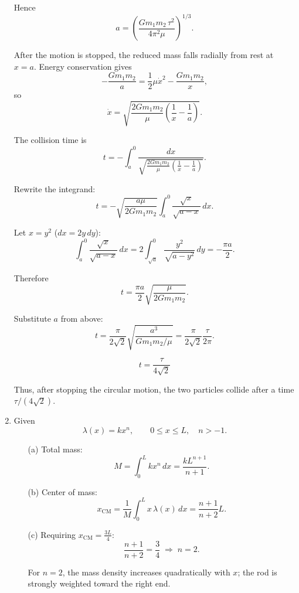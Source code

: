 \documentclass[12pt]{article}
\begin{document}
\begin{enumerate}
Hence
\[
a=\left(\frac{G m_1 m_2\,\tau^2}{4\pi^2\mu}\right)^{1/3}.
\]

After the motion is stopped, the reduced mass falls radially from rest at \(x=a\).
Energy conservation gives
\[
-\frac{G m_1 m_2}{a}
=\frac12\mu \dot x^2-\frac{G m_1 m_2}{x},
\]
so
\[
\dot x=\sqrt{\frac{2G m_1 m_2}{\mu}\left(\frac1x-\frac1a\right)}.
\]

The collision time is
\[
t=-\int_a^0
\frac{dx}{\sqrt{\tfrac{2G m_1 m_2}{\mu}\left(\frac1x-\frac1a\right)}}.
\]

Rewrite the integrand:
\[
t=-\sqrt{\frac{a\mu}{2G m_1 m_2}}
\int_a^0 \frac{\sqrt{x}}{\sqrt{a-x}}\,dx.
\]

Let \(x=y^2\) (\(dx=2y\,dy\)):
\[
\int_a^0 \frac{\sqrt{x}}{\sqrt{a-x}}\,dx
=2\int_{\sqrt a}^0 \frac{y^2}{\sqrt{a-y^2}}\,dy
=-\frac{\pi a}{2}.
\]

Therefore
\[
t=\frac{\pi a}{2}\sqrt{\frac{\mu}{2G m_1 m_2}}.
\]

Substitute \(a\) from above:
\[
t=\frac{\pi}{2\sqrt2}\sqrt{\frac{a^3}{G m_1 m_2/\mu}}
=\frac{\pi}{2\sqrt2}\frac{\tau}{2\pi}.
\]

\[
\boxed{\,t=\dfrac{\tau}{4\sqrt2}\,}
\]

Thus, after stopping the circular motion, the two particles collide after a time
\(\tau/(4\sqrt2)\).


\item Given
\[
\lambda(x)=k x^n,\qquad 0\le x\le L,\quad n>-1.
\]

\begin{enumerate}
\item[(a)] Total mass:
\[
M=\int_0^L kx^n\,dx=\frac{kL^{n+1}}{n+1}.
\]

\item[(b)] Center of mass:
\[
x_{\mathrm{CM}}=\frac{1}{M}\int_0^L x\,\lambda(x)\,dx
=\frac{n+1}{n+2}L.
\]

\item[(c)] Requiring \(x_{\mathrm{CM}}=\tfrac{3L}{4}\):
\[
\frac{n+1}{n+2}=\frac34 \;\Rightarrow\; n=2.
\]

For \(n=2\), the mass density increases quadratically with \(x\); the rod is strongly weighted toward the right end.
\end{enumerate}

\end{enumerate}
\end{document}
